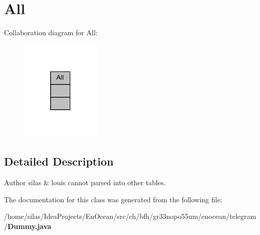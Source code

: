 \section{All}
\label{classAll}


Collaboration diagram for All\+:\nopagebreak
\begin{figure}[H]
\begin{center}
\leavevmode
\includegraphics[width=109pt]{d3/d22/classAll__coll__graph}
\end{center}
\end{figure}


\subsection{Detailed Description}
\begin{DoxyAuthor}{Author}
silas \& louis cannot parsed into other tables. 
\end{DoxyAuthor}


The documentation for this class was generated from the following file\+:\begin{DoxyCompactItemize}
\item 
/home/silas/\+Idea\+Projects/\+En\+Ocean/src/ch/bfh/gr33nopo55um/enocean/telegram/{\bf Dummy.\+java}\end{DoxyCompactItemize}
